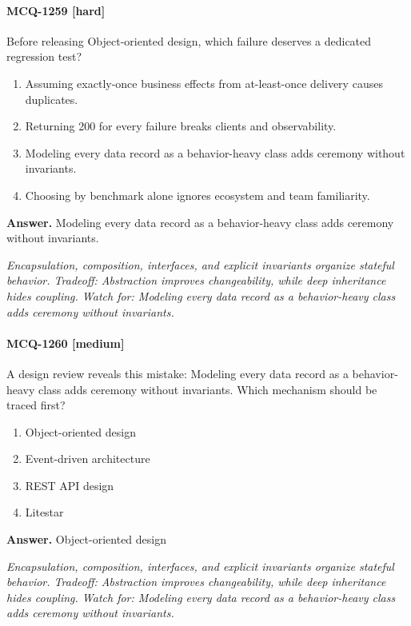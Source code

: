 \paragraph{MCQ-1259 [hard]} Before releasing Object-oriented design, which failure deserves a dedicated regression test?
\begin{enumerate}[label=\Alph*.]
\item Assuming exactly-once business effects from at-least-once delivery causes duplicates.
\item Returning 200 for every failure breaks clients and observability.
\item Modeling every data record as a behavior-heavy class adds ceremony without invariants.
\item Choosing by benchmark alone ignores ecosystem and team familiarity.
\end{enumerate}
\noindent\textbf{Answer.} Modeling every data record as a behavior-heavy class adds ceremony without invariants.
\par\textit{Encapsulation, composition, interfaces, and explicit invariants organize stateful behavior. Tradeoff: Abstraction improves changeability, while deep inheritance hides coupling. Watch for: Modeling every data record as a behavior-heavy class adds ceremony without invariants.}
\paragraph{MCQ-1260 [medium]} A design review reveals this mistake: Modeling every data record as a behavior-heavy class adds ceremony without invariants. Which mechanism should be traced first?
\begin{enumerate}[label=\Alph*.]
\item Object-oriented design
\item Event-driven architecture
\item REST API design
\item Litestar
\end{enumerate}
\noindent\textbf{Answer.} Object-oriented design
\par\textit{Encapsulation, composition, interfaces, and explicit invariants organize stateful behavior. Tradeoff: Abstraction improves changeability, while deep inheritance hides coupling. Watch for: Modeling every data record as a behavior-heavy class adds ceremony without invariants.}
